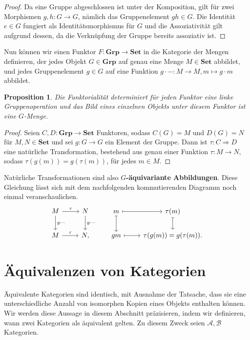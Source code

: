 \documentclass[leqno]{article}
\theoremstyle{plain}
\newtheorem{prop}[thm]{Proposition}
\theoremstyle{definition}
\theoremstyle{remark}
\begin{document}
\begin{proof} Da eine Gruppe abgeschlossen ist unter der Komposition, gilt für zwei Morphismen $g,h: G \rightarrow G$, nämlich das Gruppenelement $gh \in G$. Die Identität $e \in G$ fungiert als Identitätsmorphismus für $G$ und die Assoziativität gilt aufgrund dessen, da die Verknüpfung der Gruppe bereits assoziativ ist.
\end{proof}

Nun können wir einen Funktor $F: \textbf{Grp} \rightarrow \textbf{Set}$ in die Kategorie der Mengen definieren, der jedes Objekt $G \in \textbf{Grp}$ auf genau eine Menge $M \in \textbf{Set}$ abbildet, und jedes Gruppenelement $g \in G$ auf eine Funktion $g \cdot - : M \rightarrow M, m \mapsto g \cdot m$ abbildet.

\begin{prop}
Die Funktorialität determiniert für jeden Funktor eine linke Gruppenoperation und das Bild eines einzelnen Objekts unter diesem Funktor ist eine $G$-Menge.
\end{prop}

\begin{proof}
Seien $C,D: \textbf{Grp} \rightarrow \textbf{Set}$ Funktoren, sodass $C(G) = M$ und $D(G) = N$ für $M,N \in \textbf{Set}$ und sei $g: G \rightarrow G$ ein Element der Gruppe. Dann ist $\tau: C \Longrightarrow D$ eine natürliche Transformation, bestehend aus genau einer Funktion $\tau: M \rightarrow N$, sodass $\tau(g(m)) = g(\tau(m))$, für jedes $m \in M$.
\end{proof}

Natürliche Transformationen sind also \textbf{$G$-äquivariante Abbildungen}. Diese Gleichung lässt sich mit dem nachfolgenden kommutierenden Diagramm noch einmal veranschaulichen.
	\begin{equation}
		\begin{tikzcd}
		M \arrow[d, "g\cdot-"] \arrow[r, "\tau"] & N \arrow[d, "g\cdot-"] & m \arrow[d, maps to] \arrow[r, maps to] & \tau(m) \arrow[d, maps to] \\
		M \arrow[r, "\tau"]                      & {N,}                   & gm \arrow[r, maps to]                   & \tau(g(m)) = g(\tau(m)).  
		\end{tikzcd}
	\end{equation}

\section{Äquivalenzen von Kategorien}
Äquivalente Kategorien sind identisch, mit Ausnahme der Tatsache, dass sie eine unterschiedliche Anzahl von isomorphen Kopien eines Objekts enthalten können. Wir werden diese Aussage in diesem Abschnitt präzisieren, indem wir definieren, wann zwei Kategorien als äquivalent gelten. Zu diesem Zweck seien $\mathcal{A}, \mathcal{B}$ Kategorien. 
\end{document}
